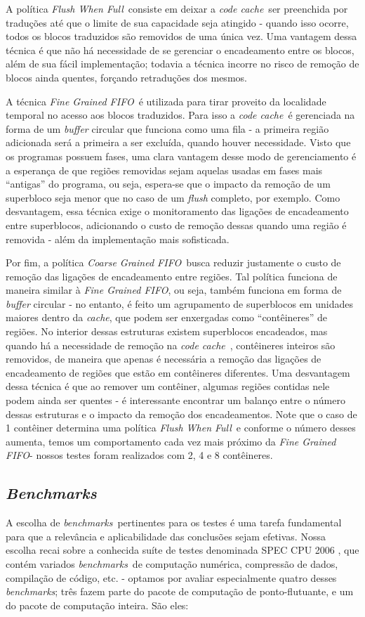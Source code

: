 \documentclass[12pt,twoside]{article}
\newcommand{\ccache}{\emph{code cache}}
\newcommand{\cache}{\emph{cache}}
\newcommand{\benchmarks}{\emph{benchmarks}}
\newcommand{\flush}{\emph{Flush When Full}}
\newcommand{\finefifo}{\emph{Fine Grained FIFO}}
\newcommand{\coarsefifo}{\emph{Coarse Grained FIFO}}
\newcommand{\qq}[1]{``#1''}
\begin{document}
A política \flush~consiste em deixar a \ccache~ser preenchida por traduções até que o limite de sua capacidade seja atingido - quando isso ocorre, todos os blocos traduzidos são removidos de uma única vez. Uma vantagem dessa técnica é que não há necessidade de se gerenciar o encadeamento entre os blocos, além de sua fácil implementação; todavia a técnica incorre no risco de remoção de blocos ainda quentes, forçando retraduções dos mesmos. 

A técnica \finefifo~é utilizada para tirar proveito da localidade temporal no acesso aos blocos traduzidos. Para isso a \ccache~é gerenciada na forma de um \emph{buffer} circular que funciona como uma fila - a primeira região adicionada será a primeira a ser excluída, quando houver necessidade. Visto que os programas possuem fases, uma clara vantagem desse modo de gerenciamento é a esperança de que regiões removidas sejam aquelas usadas em fases mais \qq{antigas} do programa, ou seja, espera-se que o impacto da remoção de um superbloco seja menor que no caso de um \emph{flush} completo, por exemplo. Como desvantagem, essa técnica exige o monitoramento das ligações de encadeamento entre superblocos, adicionando o custo de remoção dessas quando uma região é removida - além da implementação mais sofisticada.

Por fim, a política \coarsefifo~busca reduzir justamente o custo de remoção das ligações de encadeamento entre regiões. Tal política funciona de maneira similar à \finefifo, ou seja, também funciona em forma de \emph{buffer} circular - no entanto, é feito um agrupamento de superblocos em unidades maiores dentro da \cache, que podem ser enxergadas como \qq{contêineres} de regiões. No interior dessas estruturas existem superblocos encadeados, mas quando há a necessidade de remoção na \ccache~, contêineres inteiros são removidos, de maneira que apenas é necessária a remoção das ligações de encadeamento de regiões que estão em contêineres diferentes. Uma desvantagem dessa técnica é que ao remover um contêiner, algumas regiões contidas nele podem ainda ser quentes - é interessante encontrar um balanço entre o número dessas estruturas e o impacto da remoção dos encadeamentos. Note que o caso de 1 contêiner determina uma política \flush~e conforme o número desses aumenta, temos um comportamento cada vez mais próximo da \finefifo - nossos testes foram realizados com 2, 4 e 8 contêineres.


\subsection{\emph{Benchmarks}}
A escolha de \benchmarks~pertinentes para os testes é uma tarefa fundamental para que a relevância e aplicabilidade das conclusões sejam efetivas. Nossa escolha recai sobre a conhecida suíte de testes denominada SPEC CPU 2006 \cite{spec-url}, que contém variados \benchmarks~de computação numérica, compressão de dados, compilação de código, etc. - optamos por avaliar especialmente quatro desses \benchmarks; três fazem parte do pacote de computação de ponto-flutuante, e um do pacote de computação inteira. São eles:
\end{document}
